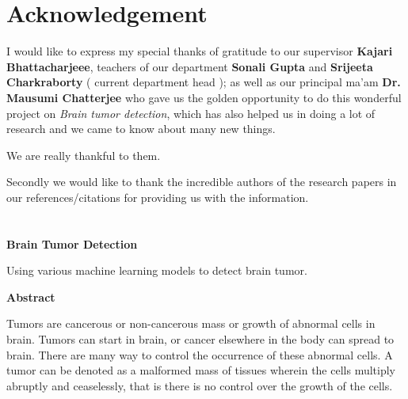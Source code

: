 \documentclass[11pt]{article}
\begin{document}
	\section[acknowledgement]{\hfill \Huge Acknowledgement \hfill}
	\label{sec:Acknowledgement}

	\vspace{1cm}

	I would like to express my special thanks of gratitude to our supervisor
	\textbf{Kajari Bhattacharjeee}, teachers of our department \textbf{Sonali
	Gupta} and \textbf{Srijeeta Charkraborty} ( current department head ); as
	well as our principal ma'am \textbf{Dr. Mausumi Chatterjee} who gave us the
	golden opportunity to do this wonderful project on \textit{Brain tumor
	detection}, which has also helped us in doing a lot of research and we came
	to know about many new things.

	We are really thankful to them.

	\vspace{1cm}

	Secondly we would like to thank the incredible authors of the research
	papers in our references/citations for providing us with the information.

	\tableofcontents

	\section[abstract]{}


	\thispagestyle{plain}
	\begin{center}
		\Large
		\textbf{Brain Tumor Detection}

		\vspace{0.4cm}
		\large
		Using various machine learning models to detect brain tumor.

		\vspace{0.5cm}
		\textbf{Abstract}
	\end{center}

	Tumors are cancerous or non-cancerous mass or growth of abnormal cells in
	brain. Tumors can start in brain, or cancer elsewhere in the body can spread
	to brain. There are many way to control the occurrence of these abnormal
	cells. A tumor can be denoted as a malformed mass of tissues wherein the
	cells multiply abruptly and ceaselessly, that is there is no control over
	the growth of the cells.
\end{document}

